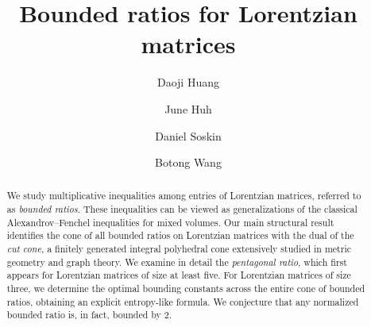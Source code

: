 \documentclass{amsart}
\theoremstyle{definition}
\theoremstyle{remark}
\begin{document}
\title{Bounded ratios for Lorentzian matrices}


\author{Daoji Huang}
\address{\rm Daoji Huang, University of Massachusetts Amherst}

\author{June Huh}
\address{\rm June Huh, Princeton University and Korea Institute for Advanced Study}

\author{Daniel Soskin}
\address{\rm Daniel Soskin, University of California, Los Angeles}

\author{Botong Wang}
\address{\rm Botong Wang, University of Wisconsin–Madison}

\begin{abstract}
We study multiplicative inequalities among entries of Lorentzian matrices, referred to as \emph{bounded ratios}.  
These inequalities can be viewed as generalizations of  the classical Alexandrov--Fenchel inequalities for mixed volumes.
Our main structural result identifies the cone of all bounded ratios on Lorentzian matrices with the dual of the \emph{cut cone}, a finitely generated integral polyhedral cone extensively studied in metric geometry and graph theory. 
We examine in detail the \emph{pentagonal ratio}, which first appears for Lorentzian matrices of size at least five.
For Lorentzian matrices of size three, we determine the optimal bounding constants across the entire cone of bounded ratios, obtaining an explicit entropy-like formula. We conjecture that any normalized bounded ratio is, in fact, bounded by $2$.
\end{abstract}
\maketitle
\end{document}
